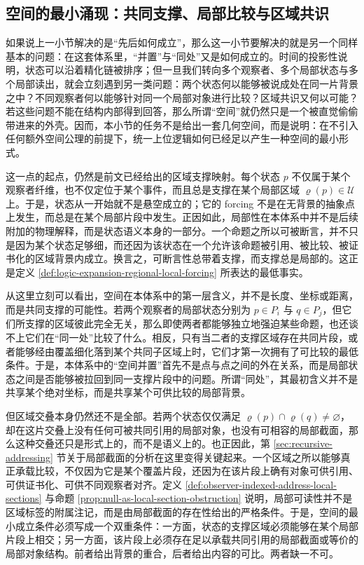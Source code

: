 \subsection{空间的最小涌现：共同支撑、局部比较与区域共识}\label{subsec:physical-spacetime-skeleton-space-shared-support}

如果说上一小节解决的是“先后如何成立”，那么这一小节要解决的就是另一个同样基本的问题：在这套体系里，“并置”与“同处”又是如何成立的。时间的投影性说明，状态可以沿着精化链被排序；但一旦我们转向多个观察者、多个局部状态与多个局部读出，就会立刻遇到另一类问题：两个状态何以能够被说成处在同一片背景之中？不同观察者何以能够针对同一个局部对象进行比较？区域共识又何以可能？若这些问题不能在结构内部得到回答，那么所谓“空间”就仍然只是一个被直觉偷偷带进来的外壳。因而，本小节的任务不是给出一套几何空间，而是说明：在不引入任何额外空间公理的前提下，统一上位逻辑如何已经足以产生一种空间的最小形式。

这一点的起点，仍然是前文已经给出的区域支撑映射。每个状态 \(p\) 不仅属于某个观察者纤维，也不仅定位于某个事件，而且总是支撑在某个局部区域 \(\varrho(p)\in\mathcal U\) 上。于是，状态从一开始就不是悬空成立的；它的 forcing 不是在无背景的抽象点上发生，而总是在某个局部片段中发生。正因如此，局部性在本体系中并不是后续附加的物理解释，而是状态语义本身的一部分。一个命题之所以可被断言，并不只是因为某个状态足够细，而还因为该状态在一个允许该命题被引用、被比较、被证书化的区域背景内成立。换言之，可断言性总带着支撑，而支撑总是局部的。这正是定义 \ref{def:logic-expansion-regional-local-forcing} 所表达的最低事实。

从这里立刻可以看出，空间在本体系中的第一层含义，并不是长度、坐标或距离，而是共同支撑的可能性。若两个观察者的局部状态分别为 \(p\in P_i\) 与 \(q\in P_j\)，但它们所支撑的区域彼此完全无关，那么即使两者都能够独立地强迫某些命题，也还谈不上它们在“同一处”比较了什么。相反，只有当二者的支撑区域存在共同片段，或者能够经由覆盖细化落到某个共同子区域上时，它们才第一次拥有了可比较的最低条件。于是，本体系中的“空间并置”首先不是点与点之间的外在关系，而是局部状态之间是否能够被拉回到同一支撑片段中的问题。所谓“同处”，其最初含义并不是共享某个绝对坐标，而是共享某个可供比较的局部背景。

但区域交叠本身仍然还不是全部。若两个状态仅仅满足 \(\varrho(p)\cap\varrho(q)\neq\varnothing\)，却在这片交叠上没有任何可被共同引用的局部对象，也没有可相容的局部截面，那么这种交叠还只是形式上的，而不是语义上的。也正因此，第 \ref{sec:recursive-addressing} 节关于局部截面的分析在这里变得关键起来。一个区域之所以能够真正承载比较，不仅因为它是某个覆盖片段，还因为在该片段上确有对象可供引用、可供证书化、可供不同观察者对齐。定义 \ref{def:observer-indexed-address-local-sections} 与命题 \ref{prop:null-as-local-section-obstruction} 说明，局部可读性并不是区域标签的附属注记，而是由局部截面的存在性给出的严格条件。于是，空间的最小成立条件必须写成一个双重条件：一方面，状态的支撑区域必须能够在某个局部片段上相交；另一方面，该片段上必须存在足以承载共同引用的局部截面或等价的局部对象结构。前者给出背景的重合，后者给出内容的可比。两者缺一不可。

